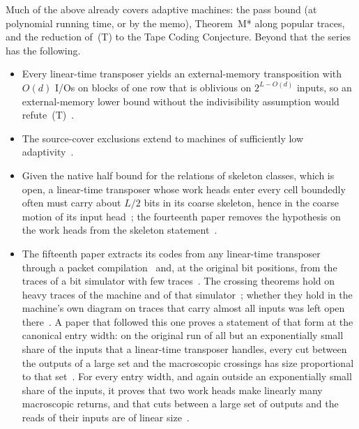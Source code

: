 Much of the above already covers adaptive machines: the pass bound (at polynomial running time, or by the memo),
Theorem~M* along popular traces, and the reduction of~(T) to the Tape Coding Conjecture. Beyond that the series has the
following.
\begin{itemize}[leftmargin=1.5em]
\item Every linear-time transposer yields an external-memory transposition with $O(d)$ I/Os on blocks of one row that
is oblivious on $2^{L-O(d)}$ inputs, so an external-memory lower bound without the indivisibility assumption would
refute~(T)~\cite[Theorem~6.4 and Corollary~6.5]{MergeDepth2026}.
\item The source-cover exclusions extend to machines of sufficiently low
adaptivity~\cite[Theorem~6.1]{MergeDepth2026}.
\item Given the native half bound for the relations of skeleton classes, which is open, a linear-time transposer whose
work heads enter every cell boundedly often must carry about $L/2$ bits in its coarse skeleton, hence in the coarse
motion of its input head~\cite[Theorem~4.13 and Corollary~4.16]{MergeDepth2026}; the fourteenth paper removes the
hypothesis on the work heads from the skeleton statement~\cite[Corollary~9.7]{BoundedStack2026}.
\item The fifteenth paper extracts its codes from any linear-time transposer through a packet
compilation~\cite[Theorem~3.1]{HighRate2026} and, at the original bit positions, from the traces of a bit simulator
with few traces~\cite[Theorems~8.1 and~9.2]{HighRate2026}. The crossing theorems hold on heavy traces of the machine and
of that simulator~\cite[Theorem~8.1]{SixteenthPaper2026}; whether they hold in the machine's own diagram on traces that
carry almost all inputs was left open there~\cite[Problem~11.2]{SixteenthPaper2026}. A paper that followed this one
proves a statement of that form at the canonical entry width: on the original run of all but an exponentially small
share of the inputs that a linear-time transposer handles, every cut between the outputs of a large set and the
macroscopic crossings has size proportional to that set~\cite[Theorem~H.7]{AdaptiveTransfer2026}. For every entry
width, and again outside an exponentially small share of the inputs, it proves that two work heads make linearly many
macroscopic returns, and that cuts between a large set of outputs and the reads of their inputs are of linear
size~\cite[Theorem~4.3 and Corollary~5.4]{AdaptiveTransfer2026}.
\end{itemize}

